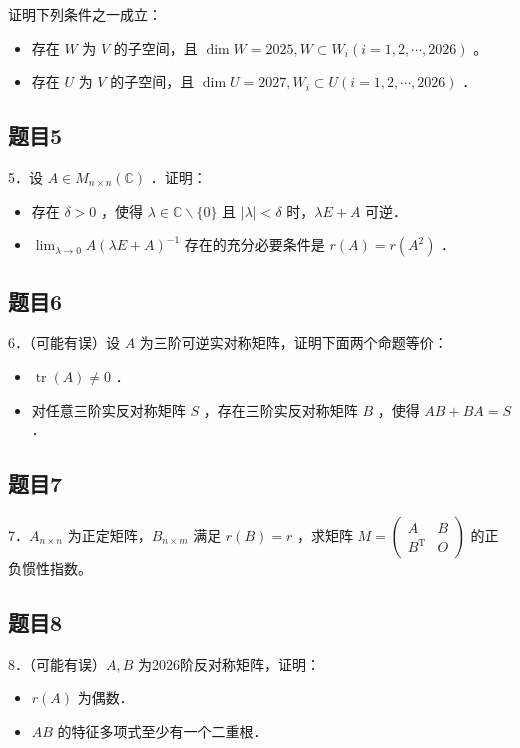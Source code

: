 \documentclass{article}
\begin{document}
证明下列条件之一成立：

\begin{itemize}
  \item[（a）] 存在 \(W\) 为 \(V\) 的子空间，且 \(\operatorname{dim} W=2025, W \subset W_{i}(i=1,2, \cdots, 2026)\) 。
  \item[（b）] 存在 \(U\) 为 \(V\) 的子空间，且 \(\operatorname{dim} U=2027, W_{i} \subset U(i=1,2, \cdots, 2026)\) ．
\end{itemize}

\subsection{题目5}
5．设 \(A \in M_{n \times n}(\mathbb{C})\) ．证明：

\begin{itemize}
  \item[（1）] 存在 \(\delta>0\) ，使得 \(\lambda \in \mathbb{C} \backslash\{0\}\) 且 \(|\lambda|<\delta\) 时，\(\lambda E+A\) 可逆．
  \item[（2）] \(\lim _{\lambda \rightarrow 0} A(\lambda E+A)^{-1}\) 存在的充分必要条件是 \(r(A)=r\left(A^{2}\right)\) ．
\end{itemize}

\subsection{题目6}
6．（可能有误）设 \(A\) 为三阶可逆实对称矩阵，证明下面两个命题等价：

\begin{itemize}
  \item[（a）] \(\operatorname{tr}(A) \neq 0\) ．
  \item[（b）] 对任意三阶实反对称矩阵 \(S\) ，存在三阶实反对称矩阵 \(B\) ，使得 \(A B+B A=S\) ．
\end{itemize}

\subsection{题目7}
7．\(A_{n \times n}\) 为正定矩阵，\(B_{n \times m}\) 满足 \(r(B)=r\) ，求矩阵 \(M=\left(\begin{array}{cc}A & B \\ B^{\mathrm{T}} & O\end{array}\right)\) 的正负惯性指数。

\subsection{题目8}
8．（可能有误）\(A, B\) 为2026阶反对称矩阵，证明：

\begin{itemize}
  \item[（1）] \(r(A)\) 为偶数．
  \item[（2）] \(A B\) 的特征多项式至少有一个二重根．
\end{itemize}
\end{document}
